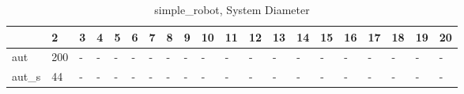 \begin{table}
\caption{simple_robot, System Diameter}
\label{simple_robot_diam}
\begin{tabular}{llllllllllllllllllll}
\toprule
 & 2 & 3 & 4 & 5 & 6 & 7 & 8 & 9 & 10 & 11 & 12 & 13 & 14 & 15 & 16 & 17 & 18 & 19 & 20 \\
\midrule
aut & 200 & - & - & - & - & - & - & - & - & - & - & - & - & - & - & - & - & - & - \\
aut_s & 44 & - & - & - & - & - & - & - & - & - & - & - & - & - & - & - & - & - & - \\
\bottomrule
\end{tabular}
\end{table}
